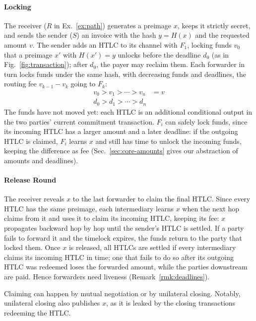 \paragraph{Locking}
The receiver ($R$ in Ex.~\ref{ex:path}) generates a preimage $x$, keeps it
strictly secret, and sends the sender ($S$) an invoice with the hash $y = H(x)$
and the requested amount $v$. The sender adds an HTLC to its channel with
$F_1$, locking funds $v_0$ that a preimage $x'$ with $H(x') = y$ unlocks before
the deadline $d_0$ (as in Fig.~\ref{fig:transaction}); after $d_0$, the payer
may reclaim them. Each forwarder in turn locks funds under the same hash, with
decreasing funds and deadlines, the routing fee $v_{k-1} - v_k$ going to $F_k$:
\begin{align}
  v_0 > v_1 > \cdots > v_n &= v \label{eq:amounts}\\
  d_0 > d_1 > \cdots > d_n & \label{eq:deadlines}
\end{align}
The funds have not moved yet: each HTLC is an additional conditional output in
the two parties' current commitment transaction. $F_i$ can safely lock funds,
since its incoming HTLC has a larger amount and a later deadline: if the
outgoing HTLC is claimed, $F_i$ learns $x$ and still has time to unlock the
incoming funds, keeping the difference as fee (Sec.~\ref{sec:core-amounts}
gives our abstraction of amounts and deadlines).

\paragraph{Release Round}
The receiver reveals $x$ to the last forwarder to claim the final HTLC. Since
every HTLC has the same preimage, each intermediary learns $x$ when the next hop
claims from it and uses it to claim its incoming HTLC, keeping its fee: $x$
propagates backward hop by hop until the sender's HTLC is settled. If a party
fails to forward it and the timelock expires, the funds return to the party
that locked them. Once $x$ is released, all HTLCs are settled if every
intermediary claims its incoming HTLC in time; one that fails to do so after
its outgoing HTLC was redeemed loses the forwarded amount, while the parties
downstream are paid. Hence forwarders need liveness
(Remark~\ref{rmk:deadlines}).

\begin{remark}\label{rmk:claiming}
Claiming can happen by mutual negotiation or by unilateral closing. Notably,
unilateral closing also publishes $x$, as it is leaked by the closing
transactions redeeming the HTLC.
\end{remark}

